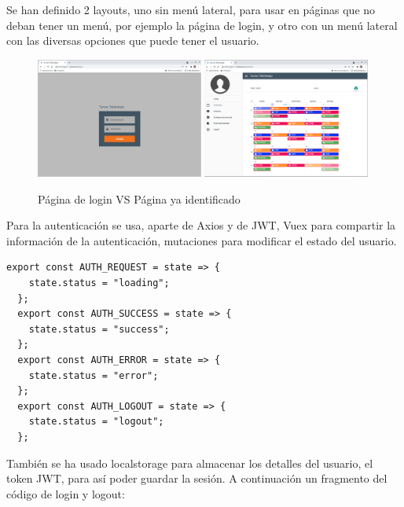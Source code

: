 \documentclass[11pt,spanish,listoffigures,listoftables]{tfgetsinf}
\begin{document}
Se han definido 2 layouts, uno sin menú lateral, para usar en páginas que no deban tener un menú, por ejemplo la página de login, y otro con un menú lateral con las diversas opciones que puede tener el usuario.

\begin{figure}[ht!] %
  \includegraphics[width=0.49\textwidth]{img/loginweb.png}
  \includegraphics[width=0.49\textwidth]{img/calendarioweb.png}
  \caption{Página de login VS Página ya identificado}
  \label{fig:loginvscalendario}
\end{figure}

Para la autenticación se usa, aparte de Axios y de JWT, Vuex para compartir la información de la autenticación, mutaciones para modificar el estado del usuario. 
\begin{lstlisting}[style=ES6, caption={Estados Vuex autenticación}]
  export const AUTH_REQUEST = state => {
    state.status = "loading";
  };
  export const AUTH_SUCCESS = state => {
    state.status = "success";
  };
  export const AUTH_ERROR = state => {
    state.status = "error";
  };
  export const AUTH_LOGOUT = state => {
    state.status = "logout";
  };
\end{lstlisting}

También se ha usado localstorage para almacenar los detalles del usuario, el token JWT, para así poder guardar la sesión. 
\clearpage
A continuación un fragmento del código de login y logout:
\end{document}

